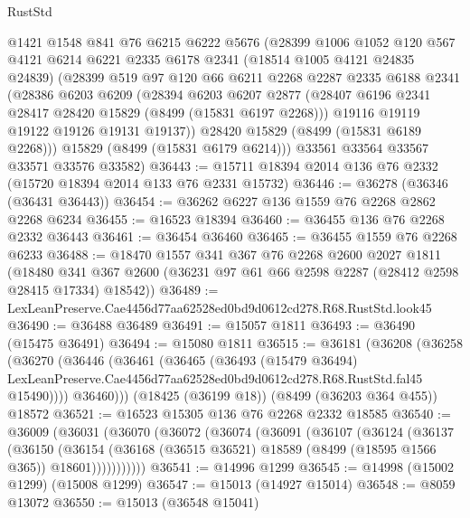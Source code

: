 \begin{lexlean}{RustStd}
\begin{coremodule}
      @1421
      @1548
      @841
      @76
      @6215
      @6222
      @5676
      (@28399
        @1006
        @1052
        @120
        @567
        @4121
        @6214
        @6221
        @2335
        @6178
        @2341
        (@18514 @1005 @4121 @24835 @24839)
        (@28399
          @519
          @97
          @120
          @66
          @6211
          @2268
          @2287
          @2335
          @6188
          @2341
          (@28386
            @6203
            @6209
            (@28394
              @6203
              @6207
              @2877
              (@28407 @6196 @2341 @28417 @28420 @15829 (@8499 (@15831 @6197 @2268)))
              @19116
              @19119
              @19122
              @19126
              @19131
              @19137))
          @28420
          @15829
          (@8499 (@15831 @6189 @2268)))
        @15829
        (@8499 (@15831 @6179 @6214)))
      @33561
      @33564
      @33567
      @33571
      @33576
      @33582)
@36443 := @15711 @18394 @2014 @136 @76 @2332 (@15720 @18394 @2014 @133 @76 @2331 @15732)
@36446 := @36278 (@36346 (@36431 @36443))
@36454 := @36262 @6227 @136 @1559 @76 @2268 @2862 @2268 @6234
@36455 := @16523 @18394
@36460 := @36455 @136 @76 @2268 @2332 @36443
@36461 := @36454 @36460
@36465 := @36455 @1559 @76 @2268 @6233
@36488 := @18470
    @1557
    @341
    @367
    @76
    @2268
    @2600
    @2027
    @1811
    (@18480 @341 @367 @2600 (@36231 @97 @61 @66 @2598 @2287 (@28412 @2598 @28415 @17334) @18542))
@36489 := LexLeanPreserve.Cae4456d77aa62528ed0bd9d0612cd278.R68.RustStd.look45
@36490 := @36488 @36489
@36491 := @15057 @1811
@36493 := @36490 (@15475 @36491)
@36494 := @15080 @1811
@36515 := @36181
    (@36208
      (@36258
        (@36270
          (@36446
            (@36461
              (@36465
                (@36493
                  (@15479 @36494)
                  LexLeanPreserve.Cae4456d77aa62528ed0bd9d0612cd278.R68.RustStd.fal45
                  @15490))))
          @36460)))
    (@18425 (@36199 @18))
    (@8499 (@36203 @364 @455))
    @18572
@36521 := @16523 @15305 @136 @76 @2268 @2332 @18585
@36540 := @36009
    (@36031
      (@36070
        (@36072
          (@36074
            (@36091
              (@36107
                (@36124
                  (@36137
                    (@36150
                      (@36154
                        (@36168 (@36515 @36521) @18589 (@8499 (@18595 @1566 @365)) @18601)))))))))))
@36541 := @14996 @1299
@36545 := @14998 (@15002 @1299) (@15008 @1299)
@36547 := @15013 (@14927 @15014)
@36548 := @8059 @13072
@36550 := @15013 (@36548 @15041)

\end{coremodule}
\end{lexlean}
